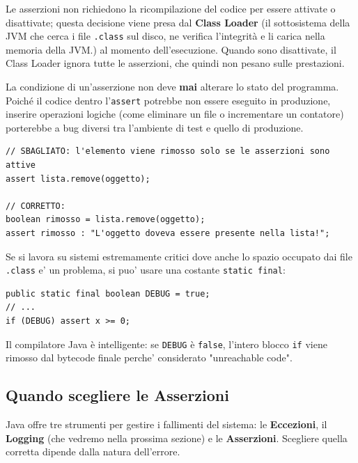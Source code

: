 Le asserzioni non richiedono la ricompilazione del codice per essere attivate o disattivate; questa decisione viene presa dal \textbf{Class Loader} (il sottosistema della JVM che cerca i file \texttt{.class} sul disco, ne verifica l'integrità e li carica nella memoria della JVM.) al momento dell'esecuzione. Quando sono disattivate, il Class Loader ignora tutte le asserzioni, che quindi non pesano sulle prestazioni. 

\begin{warningbox}
La condizione di un'asserzione non deve \textbf{mai} alterare lo stato del programma. Poiché il codice dentro l'\texttt{assert} potrebbe non essere eseguito in produzione, inserire operazioni logiche (come eliminare un file o incrementare un contatore) porterebbe a bug diversi tra l'ambiente di test e quello di produzione.
\end{warningbox}

\begin{lstlisting}[caption={Esempio di Side-Effect da evitare}]
// SBAGLIATO: l'elemento viene rimosso solo se le asserzioni sono attive
assert lista.remove(oggetto); 

// CORRETTO:
boolean rimosso = lista.remove(oggetto);
assert rimosso : "L'oggetto doveva essere presente nella lista!";
\end{lstlisting}

Se si lavora su sistemi estremamente critici dove anche lo spazio occupato dai file \texttt{.class} e' un problema, si puo' usare una costante \texttt{static final}:

\begin{lstlisting}
public static final boolean DEBUG = true;
// ...
if (DEBUG) assert x >= 0;
\end{lstlisting}

\begin{tip}
Il compilatore Java è intelligente: se \texttt{DEBUG} è \texttt{false}, l'intero blocco \texttt{if} viene rimosso dal bytecode finale perche' considerato "unreachable code".
\end{tip}

\subsection{Quando scegliere le Asserzioni}

Java offre tre strumenti per gestire i fallimenti del sistema: le \textbf{Eccezioni}, il \textbf{Logging} (che vedremo nella prossima sezione) e le \textbf{Asserzioni}. Scegliere quella corretta dipende dalla natura dell'errore.

